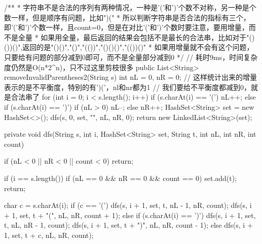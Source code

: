 \begin{Code}
/**
 * 字符串不是合法的序列有两种情况，一种是'('和')'个数不对称，另一种是个数一样，但是顺序有问题，比如")("
 * 所以判断字符串是否合法的指标有三个，即'('和')'个数一样，且count=0，但是在对比'('和')'个数时要注意，要用增量，而不是全量
 * 如果用全量，最后返回的结果会包括不是最长的合法串，比如对于"()())()",返回的是"()()","()","(())","()()()","(())()"
 * 如果用增量就不会有这个问题，只要给有问题的部分减到0即可，而不是全量部分减到0
 */
// 耗时9ms，时间复杂度仍然是O(n*2^n)，只不过这里剪枝很多
public List<String> removeInvalidParentheses2(String s) {
    int nL = 0, nR = 0;
    // 这样统计出来的增量表示的是不平衡度，特别的有')('，nl和nr都为1
    // 我们要给不平衡度都减到0，就是合法串了
    for (int i = 0; i < s.length(); i++) {
        if (s.charAt(i) == '(') {
            nL++;
        } else if (s.charAt(i) == ')') {
            if (nL > 0) {
                nL--;
            } else {
                nR++;
            }
        }
    }
    HashSet<String> set = new HashSet<>();
    dfs(s, 0, set, "", nL, nR, 0);
    return new LinkedList<String>(set);
}

private void dfs(String s, int i, HashSet<String> set, String t, int nL, int nR, int count) {
    if (nL < 0 || nR < 0 || count < 0) {
        return;
    }

    if (i == s.length()) {
        if (nL == 0 && nR == 0 && count == 0) {
            set.add(t);
        }
        return;
    }

    char c = s.charAt(i);
    if (c == '(') {
        dfs(s, i + 1, set, t, nL - 1, nR, count);
        dfs(s, i + 1, set, t + "(", nL, nR, count + 1);
    } else if (s.charAt(i) == ')') {
        dfs(s, i + 1, set, t, nL, nR - 1, count);
        dfs(s, i + 1, set, t + ")", nL, nR, count - 1);
    } else {
        dfs(s, i + 1, set, t + c, nL, nR, count);
    }
}
\end{Code}

\newpage
